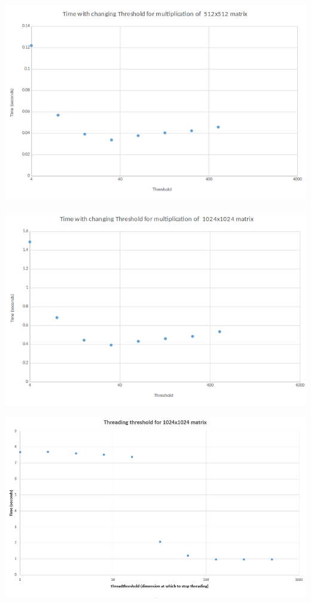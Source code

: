 \documentclass[11pt]{article}
\begin{document}
\begin{center}
\includegraphics[scale=0.9]{threshold512}
\end{center}


\begin{center}
\includegraphics[scale=0.9]{threshold1024}
\end{center}


\begin{center}
\includegraphics[scale=0.7]{threadthreashold}
\end{center}
\end{document}
